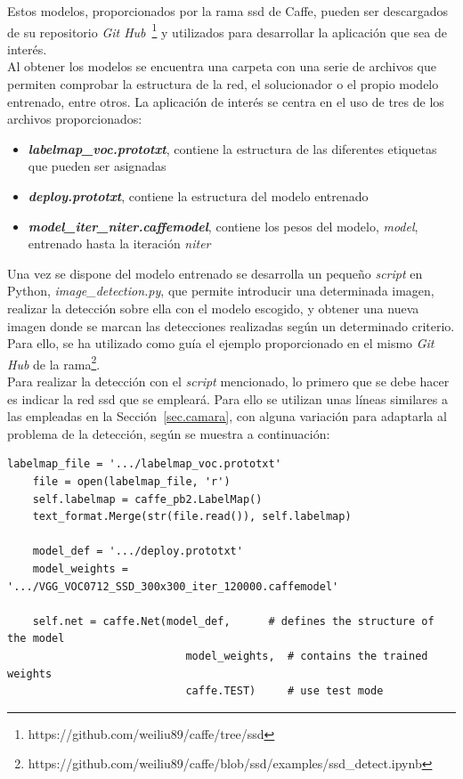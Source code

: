 Estos modelos, proporcionados por la rama \acrshort{ssd} de Caffe, pueden ser descargados de su repositorio \textit{Git Hub}~\footnote{https://github.com/weiliu89/caffe/tree/ssd} y utilizados para desarrollar la aplicación que sea de interés.\\

Al obtener los modelos se encuentra una carpeta con una serie de archivos que permiten comprobar la estructura de la red, el solucionador o el propio modelo entrenado, entre otros. La aplicación de interés se centra en el uso de tres de los archivos proporcionados:
\begin{itemize}
	\item \textbf{\textit{labelmap\_voc.prototxt}}, contiene la estructura de las diferentes etiquetas que pueden ser asignadas
	\item \textbf{\textit{deploy.prototxt}}, contiene la estructura del modelo entrenado
	\item \textbf{\textit{model\_iter\_niter.caffemodel}}, contiene los pesos del modelo, \textit{model}, entrenado hasta la iteración \textit{niter}
\end{itemize}

Una vez se dispone del modelo entrenado se desarrolla un pequeño \textit{script} en Python, \textit{image\_detection.py}, que permite introducir una determinada imagen, realizar la detección sobre ella con el modelo escogido, y obtener una nueva imagen donde se marcan las detecciones realizadas según un determinado criterio. Para ello, se ha utilizado como guía el ejemplo proporcionado en el mismo \textit{Git Hub} de la rama\footnote{https://github.com/weiliu89/caffe/blob/ssd/examples/ssd\_detect.ipynb}.\\

Para realizar la detección con el \textit{script} mencionado, lo primero que se debe hacer es indicar la red \acrshort{ssd} que se empleará. Para ello se utilizan unas líneas similares a las empleadas en la Sección~\ref{sec.camara}, con alguna variación para adaptarla al problema de la detección, según se muestra a continuación:
\vspace{10pt}
\begin{lstlisting}[frame=single]
	labelmap_file = '.../labelmap_voc.prototxt'
	file = open(labelmap_file, 'r')
	self.labelmap = caffe_pb2.LabelMap()
	text_format.Merge(str(file.read()), self.labelmap)
	
	model_def = '.../deploy.prototxt'
	model_weights = '.../VGG_VOC0712_SSD_300x300_iter_120000.caffemodel'
	
	self.net = caffe.Net(model_def,      # defines the structure of the model
							model_weights,  # contains the trained weights
							caffe.TEST)     # use test mode 
\end{lstlisting}



